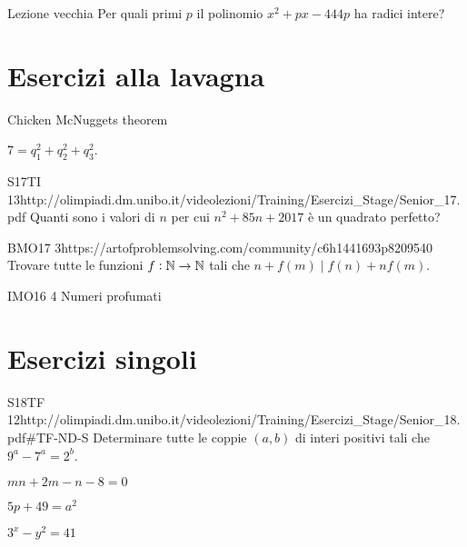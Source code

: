 \documentclass[12pt]{article}
\begin{document}
\begin{esercizio}{Lezione vecchia}{}
    Per quali primi $p$ il polinomio $x^2+px-444p$ ha radici intere?
\end{esercizio}

\section{Esercizi alla lavagna}

Chicken McNuggets theorem

$7=q_1^2+q_2^2+q_3^2$.


\begin{esercizio}{S17TI 13}{http://olimpiadi.dm.unibo.it/videolezioni/Training/Esercizi_Stage/Senior_17.pdf}
    Quanti sono i valori di $n$ per cui $n^2+85n+2017$ è un quadrato perfetto?
\end{esercizio}

\begin{esercizio}{BMO17 3}{https://artofproblemsolving.com/community/c6h1441693p8209540}
    Trovare tutte le funzioni $f:\mathbb{N}\to\mathbb{N}$ tali che $n+f(m)\mid f(n)+nf(m)$.
\end{esercizio}

\begin{esercizio}{IMO16 4}{}
    Numeri profumati
\end{esercizio}



\section{Esercizi singoli}

\begin{esercizio}{S18TF 12}{http://olimpiadi.dm.unibo.it/videolezioni/Training/Esercizi_Stage/Senior_18.pdf\#TF-ND-S}
    Determinare tutte le coppie $(a,b)$ di interi positivi tali che $9^a-7^a=2^b$.
\end{esercizio}

\begin{esercizio}{}{}
    $mn+2m-n-8=0$
\end{esercizio}

\begin{esercizio}{}{}
    $5p+49=a^2$
\end{esercizio}

\begin{esercizio}{}{}
    $3^x-y^2=41$
\end{esercizio}
\end{document}
